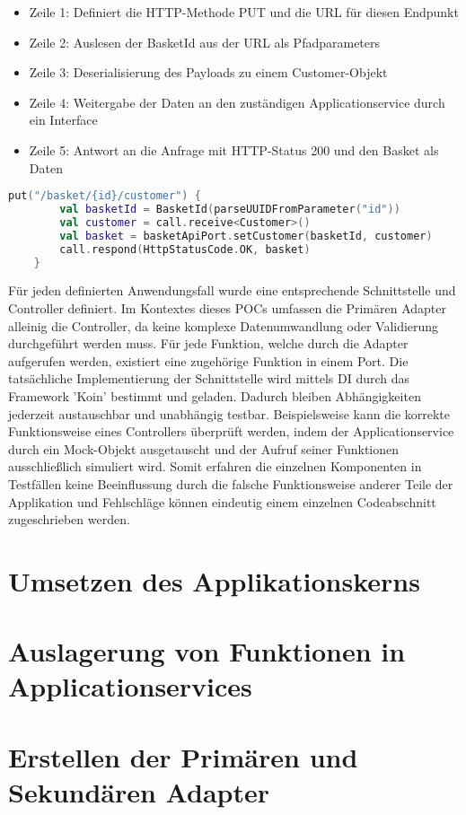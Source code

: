 \begin{itemize}[noitemsep,nolistsep,topsep=-6px]
	\item Zeile 1: Definiert die HTTP-Methode PUT und die URL für diesen Endpunkt
	\item Zeile 2: Auslesen der BasketId aus der URL als Pfadparameters 
	\item Zeile 3: Deserialisierung des Payloads zu einem Customer-Objekt
	\item Zeile 4: Weitergabe der Daten an den zuständigen Applicationservice durch ein Interface
	\item Zeile 5: Antwort an die Anfrage mit HTTP-Status 200 und den Basket als Daten
\end{itemize}

\begin{minipage}{\linewidth} %
\begin{lstlisting}[caption={Beispiel eines Controllers zur setzten von Kundendaten}, label={lst:controller}, language=Kotlin]
	put("/basket/{id}/customer") { 
		val basketId = BasketId(parseUUIDFromParameter("id")) 
		val customer = call.receive<Customer>()  
		val basket = basketApiPort.setCustomer(basketId, customer)
		call.respond(HttpStatusCode.OK, basket)
	}
\end{lstlisting}
\end{minipage}

Für jeden definierten Anwendungsfall wurde eine entsprechende Schnittstelle und Controller definiert. Im Kontextes dieses POCs umfassen die Primären Adapter alleinig die Controller, da keine komplexe Datenumwandlung oder Validierung durchgeführt werden muss. Für jede Funktion, welche durch die Adapter aufgerufen werden, existiert eine zugehörige Funktion in einem Port. Die tatsächliche Implementierung der Schnittstelle wird mittels \acrlong{DI} durch das Framework 'Koin' bestimmt und geladen. Dadurch bleiben Abhängigkeiten jederzeit austauschbar und unabhängig testbar. Beispielsweise kann die korrekte Funktionsweise eines Controllers überprüft werden, indem der Applicationservice durch ein Mock-Objekt ausgetauscht und der Aufruf seiner Funktionen ausschließlich simuliert wird. Somit erfahren die einzelnen Komponenten in Testfällen keine Beeinflussung durch die falsche Funktionsweise anderer Teile der Applikation und Fehlschläge können eindeutig einem einzelnen Codeabschnitt zugeschrieben werden.



\section{Umsetzen des Applikationskerns}
\blindtext

\section{Auslagerung von Funktionen in Applicationservices}
\blindtext

\section{Erstellen der Primären und Sekundären Adapter}
\blindtext

